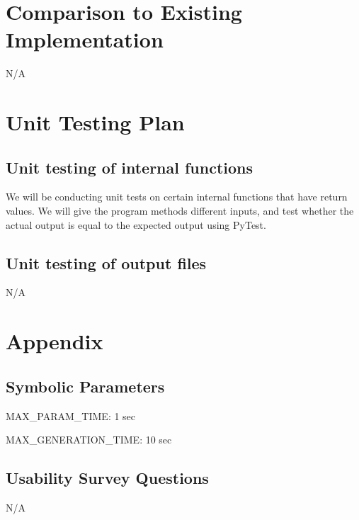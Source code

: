 \documentclass[12pt, titlepage]{article}
\begin{document}
\section{Comparison to Existing Implementation}	
N/A

\section{Unit Testing Plan}

\subsection{Unit testing of internal functions}

We will be conducting unit tests on certain internal functions that have return values. We will give the program methods different inputs, and test whether the actual output is equal to the expected output using PyTest.

\subsection{Unit testing of output files}
N/A





\newpage

\section{Appendix}

\subsection{Symbolic Parameters}

MAX\_PARAM\_TIME: 1 sec

\noindent MAX\_GENERATION\_TIME: 10 sec

\subsection{Usability Survey Questions}

N/A
\end{document}
